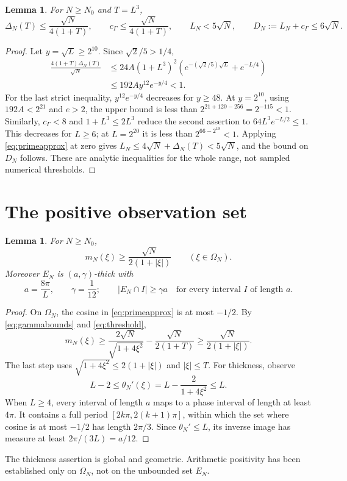 \documentclass[11pt]{article}
\newtheorem{lemma}[theorem]{Lemma}
\theoremstyle{remark}\newtheorem{remark}[theorem]{Remark}
\numberwithin{equation}{section}
\begin{document}
\begin{lemma}\label{lem:threshold}
For $N\ge N_0$ and $T=L^3$,
\begin{equation}\label{eq:threshold}
 \Delta_N(T)\le\frac{\sqrt N}{4(1+T)},\qquad
 c_\Gamma\le\frac{\sqrt N}{4(1+T)},\qquad
 L_N<5\sqrt N,\qquad D_N:=L_N+c_\Gamma\le6\sqrt N.
\end{equation}
\end{lemma}
\begin{proof}
Let $y=\sqrt L\ge2^{10}$. Since $\sqrt2/5>1/4$,
\begin{align*}
 \frac{4(1+T)\Delta_N(T)}{\sqrt N}
 &\le24A(1+L^3)^2
       \left(e^{-(\sqrt2/5)\sqrt L}+e^{-L/4}\right)\\
 &\le192A y^{12}e^{-y/4}<1.
\end{align*}
For the last strict inequality, $y^{12}e^{-y/4}$ decreases for $y\ge48$. At $y=2^{10}$, using $192A<2^{21}$ and $e>2$, the upper bound is less than
$2^{21+120-256}=2^{-115}<1$.
Similarly, $c_\Gamma<8$ and $1+L^3\le2L^3$ reduce the second assertion to $64L^3e^{-L/2}\le1$. This decreases for $L\ge6$; at $L=2^{20}$ it is less than $2^{66-2^{19}}<1$. Applying \eqref{eq:primeapprox} at zero gives $L_N\le4\sqrt N+\Delta_N(T)<5\sqrt N$, and the bound on $D_N$ follows. These are analytic inequalities for the whole range, not sampled numerical thresholds.
\end{proof}

\section{The positive observation set}\label{sec:positive}
\begin{lemma}\label{lem:positive}
For $N\ge N_0$,
\begin{equation}\label{eq:positive}
 m_N(\xi)\ge\frac{\sqrt N}{2(1+|\xi|)}\qquad(\xi\in\Omega_N).
\end{equation}
Moreover $E_N$ is $(a,\gamma)$-thick with
\begin{equation}\label{eq:thickness}
 a=\frac{8\pi}{L},\qquad \gamma=\frac1{12};
 \qquad |E_N\cap I|\ge\gamma a
 \quad\text{for every interval $I$ of length $a$}.
\end{equation}
\end{lemma}
\begin{proof}
On $\Omega_N$, the cosine in \eqref{eq:primeapprox} is at most $-1/2$. By \eqref{eq:gammabounds} and \eqref{eq:threshold},
\[
 m_N(\xi)\ge\frac{2\sqrt N}{\sqrt{1+4\xi^2}}
               -\frac{\sqrt N}{2(1+T)}
 \ge\frac{\sqrt N}{2(1+|\xi|)}.
\]
The last step uses $\sqrt{1+4\xi^2}\le2(1+|\xi|)$ and $|\xi|\le T$.
For thickness, observe
\[
 L-2\le\theta_N'(\xi)=L-\frac2{1+4\xi^2}\le L.
\]
When $L\ge4$, every interval of length $a$ maps to a phase interval of length at least $4\pi$. It contains a full period $[2k\pi,2(k+1)\pi]$, within which the set where cosine is at most $-1/2$ has length $2\pi/3$. Since $\theta_N'\le L$, its inverse image has measure at least $2\pi/(3L)=a/12$.
\end{proof}
The thickness assertion is global and geometric. Arithmetic positivity has been established only on $\Omega_N$, not on the unbounded set $E_N$.
\end{document}
